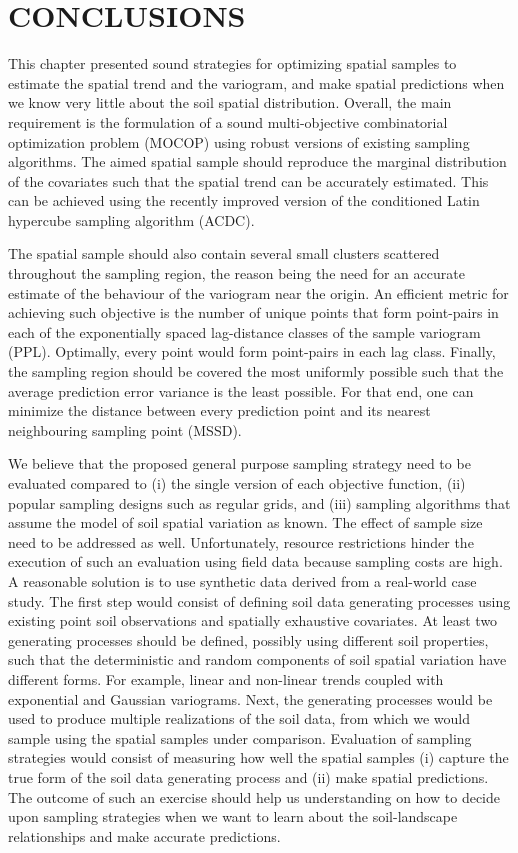 \section{CONCLUSIONS}

This chapter presented sound strategies for optimizing spatial samples to estimate the spatial trend and the 
variogram, and make spatial predictions when we know very little about the soil spatial distribution. Overall, 
the main requirement is the formulation of a sound multi-objective combinatorial optimization problem (MOCOP) 
using robust versions of existing sampling algorithms. The aimed spatial sample should reproduce the marginal 
distribution of the covariates such that the spatial trend can be accurately estimated. This can be achieved 
using the recently improved version of the conditioned Latin hypercube sampling algorithm (ACDC).

The spatial sample should also contain several small clusters scattered throughout the sampling region, the 
reason being the need for an accurate estimate of the behaviour of the variogram near the origin. An efficient 
metric for achieving such objective is the number of unique points that form point-pairs in each of the 
exponentially spaced lag-distance classes of the sample variogram (PPL). Optimally, every point would form 
point-pairs in each lag class. Finally, the sampling region should be covered the most uniformly possible such 
that the average prediction error variance is the least possible. For that end, one can minimize the distance 
between every prediction point and its nearest neighbouring sampling point (MSSD).

We believe that the proposed general purpose sampling strategy need to be evaluated compared to (i) the single 
version of each objective function, (ii) popular sampling designs such as regular grids, and (iii) sampling 
algorithms that assume the model of soil spatial variation as known. The effect of sample size need to be 
addressed as well. Unfortunately, resource restrictions hinder the execution of such an evaluation using field 
data because sampling costs are high. A reasonable solution is to use synthetic data derived from a real-world 
case study. The first step would consist of defining soil data generating processes using existing point soil 
observations and spatially exhaustive covariates. At least two generating processes should be defined, 
possibly 
using different soil properties, such that the deterministic and random components of soil spatial variation 
have different forms. For example, linear and non-linear trends coupled with exponential and Gaussian 
variograms. Next, the generating processes would be used to produce multiple realizations of the soil data, 
from which we would sample using the spatial samples under comparison. Evaluation of sampling strategies would 
consist of measuring how well the spatial samples (i) capture the true form of the soil data generating 
process and (ii) make spatial predictions. The outcome of such an exercise should help us understanding on how 
to decide upon sampling strategies when we want to learn about the soil-landscape relationships and make 
accurate predictions.

